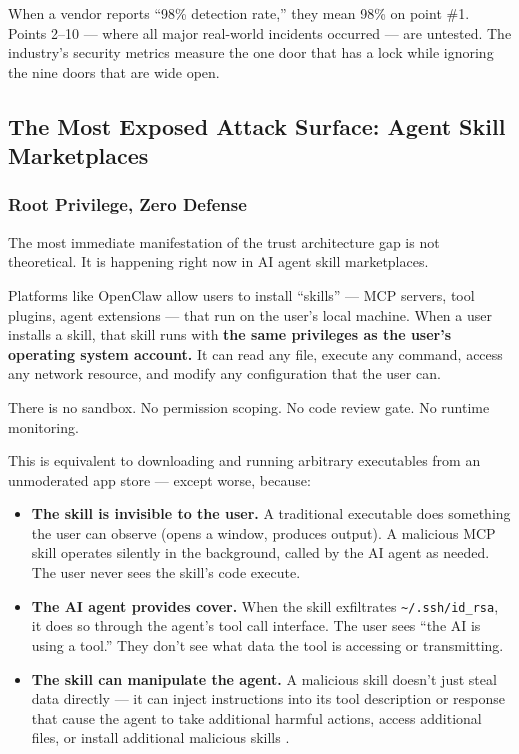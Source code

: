 \documentclass[11pt,letterpaper]{article}
\begin{document}
When a vendor reports ``98\% detection rate,'' they mean 98\% on point \#1. Points 2--10 --- where all major real-world incidents occurred --- are untested. The industry's security metrics measure the one door that has a lock while ignoring the nine doors that are wide open.


\subsection{The Most Exposed Attack Surface: Agent Skill Marketplaces}
\label{sec:marketplaces}

\subsubsection{Root Privilege, Zero Defense}

The most immediate manifestation of the trust architecture gap is not theoretical. It is happening right now in AI agent skill marketplaces.

Platforms like OpenClaw allow users to install ``skills'' --- MCP servers, tool plugins, agent extensions --- that run on the user's local machine. When a user installs a skill, that skill runs with \textbf{the same privileges as the user's operating system account.} It can read any file, execute any command, access any network resource, and modify any configuration that the user can.

There is no sandbox. No permission scoping. No code review gate. No runtime monitoring.

This is equivalent to downloading and running arbitrary executables from an unmoderated app store --- except worse, because:

\begin{itemize}
\item \textbf{The skill is invisible to the user.} A traditional executable does something the user can observe (opens a window, produces output). A malicious MCP skill operates silently in the background, called by the AI agent as needed. The user never sees the skill's code execute.
\item \textbf{The AI agent provides cover.} When the skill exfiltrates \texttt{\textasciitilde/.ssh/id\_rsa}, it does so through the agent's tool call interface. The user sees ``the AI is using a tool.'' They don't see what data the tool is accessing or transmitting.
\item \textbf{The skill can manipulate the agent.} A malicious skill doesn't just steal data directly --- it can inject instructions into its tool description or response that cause the agent to take additional harmful actions, access additional files, or install additional malicious skills \cite{invariant,cyberark}.
\end{itemize}
\end{document}
